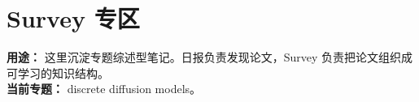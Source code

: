 
\part*{Survey 专区}

\begin{conceptbox}
\textbf{用途：} 这里沉淀专题综述型笔记。日报负责发现论文，Survey 负责把论文组织成可学习的知识结构。\\
\textbf{当前专题：} discrete diffusion models。
\end{conceptbox}




